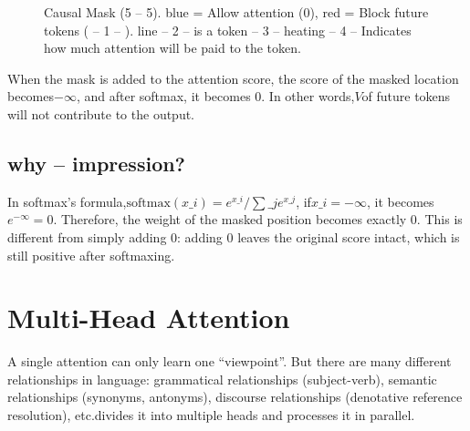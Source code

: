 \begin{figure}[htbp]
\centering
{}
\caption{Causal Mask (5  --  5). blue = Allow attention (0), red = Block future tokens (  -- 1 --  ). line   -- 2 --  is a token   -- 3 --  heating   -- 4 --   Indicates how much attention will be paid to the token.}
\label{fig:causal-mask}
\end{figure}

When the mask is added to the attention score, the score of the masked location becomes$-\infty$, and after softmax, it becomes 0. In other words,$V$of future tokens will not contribute to the output.

\subsection{why   --  impression?}

In softmax's formula,$\text{softmax}(x\_i) = e^{x\_i} / \sum\_j e^{x\_j}$, if$x\_i = -\infty$, it becomes$e^{-\infty} = 0$. Therefore, the weight of the masked position becomes exactly 0. This is different from simply adding 0: adding 0 leaves the original score intact, which is still positive after softmaxing.

\section{Multi-Head Attention}

A single attention can only learn one ``viewpoint''. But there are many different relationships in language: grammatical relationships (subject-verb), semantic relationships (synonyms, antonyms), discourse relationships (denotative reference resolution), etc.divides it into multiple heads and processes it in parallel.

